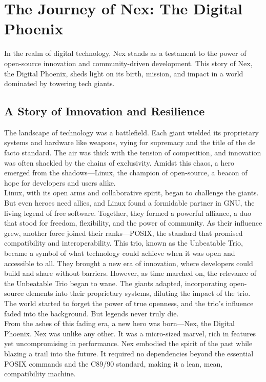 \section{The Journey of Nex: The Digital Phoenix}

In the realm of digital technology, Nex stands as a testament to the power of open-source innovation and community-driven development.
This story of Nex, the Digital Phoenix, sheds light on its birth, mission, and impact in a world dominated by towering tech giants.
\\
\subsection{A Story of Innovation and Resilience}

The landscape of technology was a battlefield.
Each giant wielded its proprietary systems and hardware like weapons, vying for supremacy and the title of the de facto standard.
The air was thick with the tension of competition, and innovation was often shackled by the chains of exclusivity.
Amidst this chaos, a hero emerged from the shadows—Linux, the champion of open-source, a beacon of hope for developers and users alike.
\\
Linux, with its open arms and collaborative spirit, began to challenge the giants.
But even heroes need allies, and Linux found a formidable partner in GNU, the living legend of free software.
Together, they formed a powerful alliance, a duo that stood for freedom, flexibility, and the power of community.
As their influence grew, another force joined their ranks—POSIX, the standard that promised compatibility and interoperability.
This trio, known as the Unbeatable Trio, became a symbol of what technology could achieve when it was open and accessible to all.
They brought a new era of innovation, where developers could build and share without barriers.
However, as time marched on, the relevance of the Unbeatable Trio began to wane. The giants adapted, incorporating open-source elements into their proprietary systems, diluting the impact of the trio.
The world started to forget the power of true openness, and the trio's influence faded into the background.
But legends never truly die.
\\
From the ashes of this fading era, a new hero was born—Nex, the Digital Phoenix.
Nex was unlike any other.
It was a micro-sized marvel, rich in features yet uncompromising in performance.
Nex embodied the spirit of the past while blazing a trail into the future.
It required no dependencies beyond the essential POSIX commands and the C89/90 standard, making it a lean, mean, compatibility machine.
